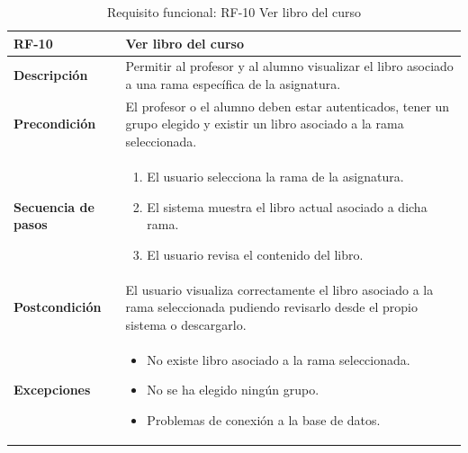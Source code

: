 \begin{table}[H]
\centering
\begin{tabularx}{\textwidth}{
  |>{\centering\arraybackslash}l
  |>{\centering\arraybackslash}X|}
\hline
\textbf{RF-10} & \textbf{Ver libro del curso} \\ \hline

\textbf{Descripción} & Permitir al profesor y al alumno visualizar el libro asociado a una rama específica de la asignatura. \\ \hline

\textbf{Precondición} & El profesor o el alumno deben estar autenticados, tener un grupo elegido y existir un libro asociado a la rama seleccionada. \\ \hline

\textbf{Secuencia de pasos} & 
\begin{enumerate}
  \item El usuario selecciona la rama de la asignatura.
  \item El sistema muestra el libro actual asociado a dicha rama.
  \item El usuario revisa el contenido del libro.
\end{enumerate} \\ \hline

\textbf{Postcondición} & El usuario visualiza correctamente el libro asociado a la rama seleccionada pudiendo revisarlo desde el propio sistema o descargarlo. \\ \hline

\textbf{Excepciones} & 
\begin{itemize}
  \item No existe libro asociado a la rama seleccionada.
  \item No se ha elegido ningún grupo.
  \item Problemas de conexión a la base de datos.
\end{itemize} \\ \hline
\end{tabularx}
\caption{Requisito funcional: RF-10 Ver libro del curso}
\end{table}
